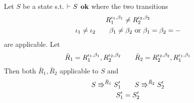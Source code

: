 \begin{lemma} \label{lem:lemma1}
  Let $S$ be a state s.t. $\vdash S \:\: \mbox{\bf ok}$ where the two transitions
  \begin{equation*}
    \begin{gathered}
      R_1^{\iota_1, \beta_1} \neq R_2^{\iota_2, \beta_2} \\
      \iota_1 \neq \iota_2 \quad\quad \beta_1 \neq \beta_2 \text{ or } \beta_1 =
      \beta_2 = - 
    \end{gathered}
  \end{equation*}
  are applicable.
  Let
  \begin{equation*}
    \bar{R}_1  = R_1^{\iota_1, \beta_1}, R_2^{\iota_2, \beta_2} \quad\quad
    \bar{R}_2 = R_2^{\iota_2, \beta_2}, R_1^{\iota_1, \beta_1}
  \end{equation*}
  Then both $\bar{R}_1, \bar{R}_2$ applicable to $S$ and
  \begin{equation*}
    \begin{gathered}
      S \Rrightarrow^{\bar{R}_1} S'_1 \quad\quad S \Rrightarrow^{\bar{R}_2} S'_2
      \\
      S'_1 = S'_2
    \end{gathered}
  \end{equation*}
\end{lemma}

